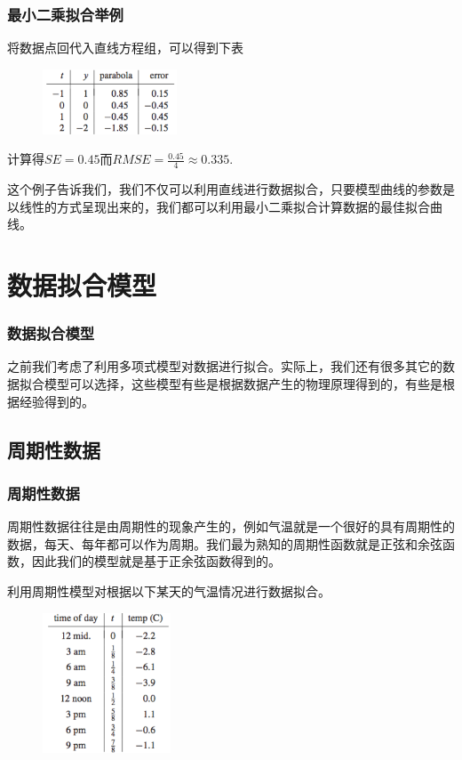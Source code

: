 \documentclass[10pt]{beamer}
\begin{document}
\begin{frame}
\frametitle{最小二乘拟合举例}
将数据点回代入直线方程组，可以得到下表
\begin{figure}
\includegraphics[width=4cm]{figs/4-1-2_Fitting_Data-5} 
\end{figure}
计算得$SE = 0.45$而$RMSE = \frac{0.45}{4} \approx 0.335$.

\vspace{0.2cm}

这个例子告诉我们，我们不仅可以利用直线进行数据拟合，只要模型曲线的参数是以线性的方式呈现出来的，我们都可以利用最小二乘拟合计算数据的最佳拟合曲线。
\end{frame}





\section{数据拟合模型}


\begin{frame}
\frametitle{数据拟合模型}
之前我们考虑了利用多项式模型对数据进行拟合。实际上，我们还有很多其它的数据拟合模型可以选择，这些模型有些是根据数据产生的物理原理得到的，有些是根据经验得到的。
\end{frame}


\subsection{周期性数据}

\begin{frame}
\frametitle{周期性数据}
周期性数据往往是由周期性的现象产生的，例如气温就是一个很好的具有周期性的数据，每天、每年都可以作为周期。我们最为熟知的周期性函数就是正弦和余弦函数，因此我们的模型就是基于正余弦函数得到的。

\begin{example}
利用周期性模型对根据以下某天的气温情况进行数据拟合。
\begin{figure}
\includegraphics[width=3.8cm]{figs/4-2-1_Perriodic_Data-1} 
\end{figure}
\end{example}
\end{frame}
\end{document}
